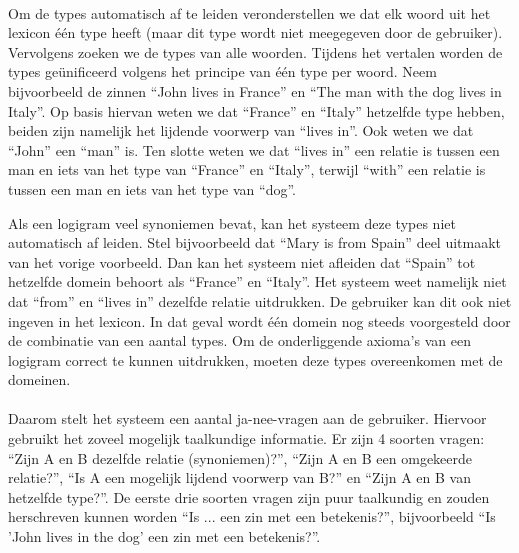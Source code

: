 \paragraph{} Om de types automatisch af te leiden veronderstellen we dat elk woord uit het lexicon één type heeft (maar dit type wordt niet meegegeven door de gebruiker). Vervolgens zoeken we de types van alle woorden. Tijdens het vertalen worden de types geünificeerd volgens het principe van één type per woord. Neem bijvoorbeeld de zinnen ``John lives in France'' en ``The man with the dog lives in Italy''. Op basis hiervan weten we dat ``France'' en ``Italy'' hetzelfde type hebben, beiden zijn namelijk het lijdende voorwerp van ``lives in''. Ook weten we dat ``John'' een ``man'' is. Ten slotte weten we dat ``lives in'' een relatie is tussen een man en iets van het type van ``France'' en ``Italy'', terwijl ``with'' een relatie is tussen een man en iets van het type van ``dog''.

Als een logigram veel synoniemen bevat, kan het systeem deze types niet automatisch af leiden. Stel bijvoorbeeld dat ``Mary is from Spain'' deel uitmaakt van het vorige voorbeeld. Dan kan het systeem niet afleiden dat ``Spain'' tot hetzelfde domein behoort als ``France'' en ``Italy''. Het systeem weet namelijk niet dat ``from'' en ``lives in'' dezelfde relatie uitdrukken. De gebruiker kan dit ook niet ingeven in het lexicon. In dat geval wordt één domein nog steeds voorgesteld door de combinatie van een aantal types. Om de onderliggende axioma's van een logigram correct te kunnen uitdrukken, moeten deze types overeenkomen met de domeinen.


\paragraph{} Daarom stelt het systeem een aantal ja-nee-vragen aan de gebruiker. Hiervoor gebruikt het zoveel mogelijk taalkundige informatie. Er zijn 4 soorten vragen: ``Zijn A en B dezelfde relatie (synoniemen)?'', ``Zijn A en B een omgekeerde relatie?'', ``Is A een mogelijk lijdend voorwerp van B?'' en ``Zijn A en B van hetzelfde type?''. De eerste drie soorten vragen zijn puur taalkundig en zouden herschreven kunnen worden ``Is ... een zin met een betekenis?'', bijvoorbeeld ``Is 'John lives in the dog' een zin met een betekenis?''.

